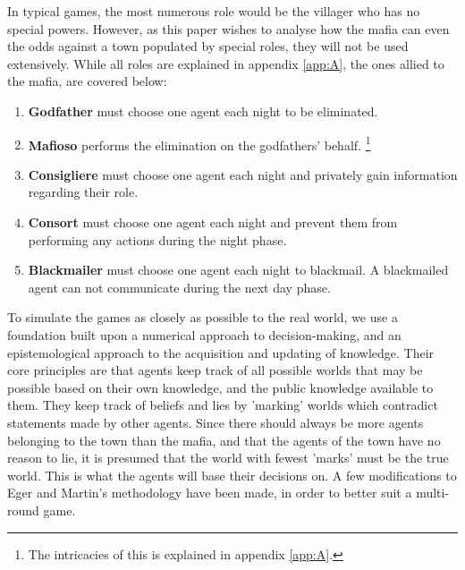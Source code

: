 In typical games, the most numerous role would be the villager who has no
special powers. However, as this paper wishes to analyse how the mafia can even
the odds against a town populated by special roles, they will not be used
extensively. While all roles are explained in appendix \ref{app:A}, the ones
allied to the mafia, are covered below:

\begin{enumerate}
	\itemsep0px
	\item\textbf{Godfather} must choose one agent each night to be eliminated.
	\item\textbf{Mafioso} performs the elimination on the godfathers' behalf. \footnote{The intricacies of this is explained in appendix \ref{app:A}.}
	\item\textbf{Consigliere} must choose one agent each night and privately
	      gain information regarding their role.
	\item\textbf{Consort} must choose one agent each night and prevent them
	      from performing any actions during the night phase.
	\item\textbf{Blackmailer} must choose one agent each night to blackmail. A
	      blackmailed agent can not communicate during the next day phase.
	      \label{lst:Roles}
\end{enumerate}

To simulate the games as closely as possible to the real world, we use a
foundation built upon a numerical approach to decision-making, and an
epistemological approach to the acquisition and updating of
knowledge\cite{commitment}. Their core principles are that agents keep track of
all possible worlds that may be possible based on their own knowledge, and the
public knowledge available to them. They keep track of beliefs and lies by
'marking' worlds which contradict statements made by other agents. Since there
should always be more agents belonging to the town than the mafia, and that the
agents of the town have no reason to lie, it is presumed that the world with
fewest 'marks' must be the true world. This is what the agents will base their
decisions on. A few modifications to Eger and Martin's\cite{commitment}
methodology have been made, in order to better suit a multi-round game.

